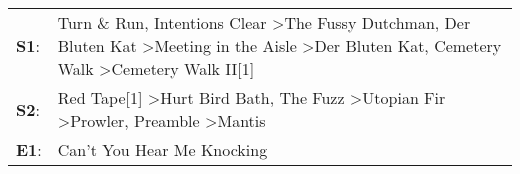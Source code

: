 \begin{supertabular}{p{0.03\textwidth}p{0.92\textwidth}}
 \textbf{S1}:  &  Turn \& Run\textsuperscript{}, \enspace Intentions Clear\textsuperscript{} \textgreater \enspace The Fussy Dutchman\textsuperscript{}, \enspace Der Bluten Kat\textsuperscript{} \textgreater \enspace Meeting in the Aisle\textsuperscript{} \textgreater \enspace Der Bluten Kat\textsuperscript{}, \enspace Cemetery Walk\textsuperscript{} \textgreater \enspace Cemetery Walk II[1]\textsuperscript{}  \enspace  \\
 \textbf{S2}:  &                                                                                           Red Tape[1]\textsuperscript{} \textgreater \enspace Hurt Bird Bath\textsuperscript{}, \enspace The Fuzz\textsuperscript{} \textgreater \enspace Utopian Fir\textsuperscript{} \textgreater \enspace Prowler\textsuperscript{}, \enspace Preamble\textsuperscript{} \textgreater \enspace Mantis\textsuperscript{}  \enspace  \\
 \textbf{E1}:  &                                                                                                                                                                                                                                                                                                                                                                Can't You Hear Me Knocking\textsuperscript{}  \enspace  \\
\end{supertabular}
